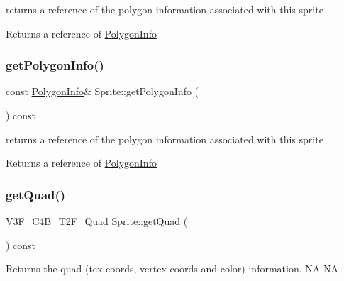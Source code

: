 returns a reference of the polygon information associated with this sprite

\begin{DoxyReturn}{Returns}
a reference of \hyperlink{classPolygonInfo}{Polygon\+Info} 
\end{DoxyReturn}
\mbox{\label{classSprite_a428649648496eb633fba0bd4bb2bc511}} 
\subsubsection{\texorpdfstring{get\+Polygon\+Info()}{getPolygonInfo()}\hspace{0.1cm}{\footnotesize\ttfamily [2/2]}}
{\footnotesize\ttfamily const \hyperlink{classPolygonInfo}{Polygon\+Info}\& Sprite\+::get\+Polygon\+Info (\begin{DoxyParamCaption}{ }\end{DoxyParamCaption}) const}

returns a reference of the polygon information associated with this sprite

\begin{DoxyReturn}{Returns}
a reference of \hyperlink{classPolygonInfo}{Polygon\+Info} 
\end{DoxyReturn}
\mbox{\label{classSprite_abc0684e4913ae8aefb0f72c48c2514d1}} 
\subsubsection{\texorpdfstring{get\+Quad()}{getQuad()}\hspace{0.1cm}{\footnotesize\ttfamily [1/2]}}
{\footnotesize\ttfamily \hyperlink{structV3F__C4B__T2F__Quad}{V3\+F\+\_\+\+C4\+B\+\_\+\+T2\+F\+\_\+\+Quad} Sprite\+::get\+Quad (\begin{DoxyParamCaption}{ }\end{DoxyParamCaption}) const\hspace{0.3cm}{\ttfamily [inline]}}

Returns the quad (tex coords, vertex coords and color) information.  NA  NA \mbox{\label{classSprite_abc0684e4913ae8aefb0f72c48c2514d1}} 
